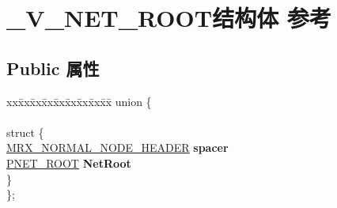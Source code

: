 \hypertarget{struct___v___n_e_t___r_o_o_t}{}\section{\+\_\+\+V\+\_\+\+N\+E\+T\+\_\+\+R\+O\+O\+T结构体 参考}
\label{struct___v___n_e_t___r_o_o_t}
\subsection*{Public 属性}
\begin{DoxyCompactItemize}
\item 
\mbox{\label{struct___v___n_e_t___r_o_o_t_a9df02280c142cee92b7adf263228aa63}} 
\begin{tabbing}
xx\=xx\=xx\=xx\=xx\=xx\=xx\=xx\=xx\=\kill
union \{\\
\\
\mbox{\label{union___v___n_e_t___r_o_o_t_1_1_0D1576_a3fc020bc1be46fb5dc968cb6603b235a}} 
\>struct \{\\
\>\>\hyperlink{struct___m_r_x___n_o_r_m_a_l___n_o_d_e___h_e_a_d_e_r}{MRX\_NORMAL\_NODE\_HEADER} {\bfseries spacer}\\
\>\>\hyperlink{struct___n_e_t___r_o_o_t}{PNET\_ROOT} {\bfseries NetRoot}\\
\>\} \\
\}; \\


\end{tabbing}
\end{DoxyCompactItemize}
